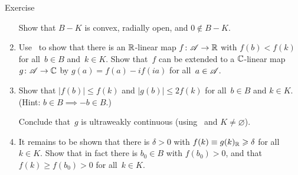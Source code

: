 \documentclass[a]{subfiles}
\begin{document}
\begin{parsec}
\begin{point}[ultraclosed]{Exercise}
\begin{enumerate}
	Show that $B-K$ is convex, radially open, and $0\notin B-K$.
\item
	Use~ to show that
	 there is an $\mathbb{R}$-linear map $f\colon \mathscr{A}\to \mathbb{R}$
	with $f(b)<f(k)$ for all~$b\in B$ and~$k\in K$.
	Show that~$f$
	can be extended to a $\mathbb{C}$-linear map
	$g \colon \mathscr{A}\to \mathbb{C}$
	by $g(a)= f(a)-if(ia)$ for all~$a\in\mathscr{A}$.
\item
	Show that $\left| f(b)\right| \leq f(k)$ 
	and $\left|g(b)\right|\leq 2f(k)$
	for all~$b\in B$ and $k\in K$.\\
	(Hint: $b\in B\implies -b\in B$.)

	Conclude that~$g$ is ultraweakly continuous
	(using~ and $K\neq \varnothing$).
\item
	It remains to be shown that
	there is $\delta>0$ with $f(k)\equiv g(k)_{\mathbb{R}}\geqslant \delta$
	for all~$k\in K$.
	Show that in fact there is $b_0\in B$
	with $f(b_0) >0$,
	and  that $f(k)\geq f(b_0)>0 $ for all~$k\in K$.
\end{enumerate}
\end{point}
\end{parsec}
\end{document}
